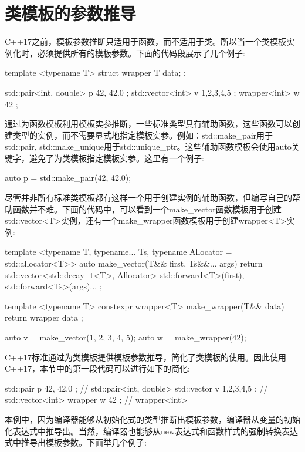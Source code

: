 \section{类模板的参数推导}
C++17之前，模板参数推断只适用于函数，而不适用于类。所以当一个类模板实例化时，必须提供所有的模板参数。下面的代码段展示了几个例子:

\begin{cpp}
template <typename T>
struct wrapper
{
	T data;
};

std::pair<int, double> p{ 42, 42.0 };
std::vector<int> v{ 1,2,3,4,5 };
wrapper<int> w{ 42 };
\end{cpp}

通过为函数模板利用模板实参推断，一些标准类型具有辅助函数，这些函数可以创建类型的实例，而不需要显式地指定模板实参。例如：std::make\_pair用于std::pair, std::make\_unique用于std::unique\_ptr。这些辅助函数模板会使用auto关键字，避免了为类模板指定模板实参。这里有一个例子:

\begin{cpp}
auto p = std::make_pair(42, 42.0);
\end{cpp}

尽管并非所有标准类模板都有这样一个用于创建实例的辅助函数，但编写自己的帮助函数并不难。下面的代码中，可以看到一个make\_vector函数模板用于创建std::vector<T>实例，还有一个make\_wrapper函数模板用于创建wrapper<T>实例:

\begin{cpp}
template <typename T, typename... Ts,
typename Allocator = std::allocator<T>>
auto make_vector(T&& first, Ts&&... args)
{
	return std::vector<std::decay_t<T>, Allocator> {
		std::forward<T>(first),
		std::forward<Ts>(args)...
	};
}

template <typename T>
constexpr wrapper<T> make_wrapper(T&& data)
{
	return wrapper{ data };
}

auto v = make_vector(1, 2, 3, 4, 5);
auto w = make_wrapper(42);
\end{cpp}

C++17标准通过为类模板提供模板参数推导，简化了类模板的使用。因此使用C++17，本节中的第一段代码可以进行如下的简化:

\begin{cpp}
std::pair p{ 42, 42.0 }; // std::pair<int, double>
std::vector v{ 1,2,3,4,5 }; // std::vector<int>
wrapper w{ 42 }; // wrapper<int>
\end{cpp}

本例中，因为编译器能够从初始化式的类型推断出模板参数，编译器从变量的初始化表达式中推导出。当然，编译器也能够从new表达式和函数样式的强制转换表达式中推导出模板参数。下面举几个例子:

